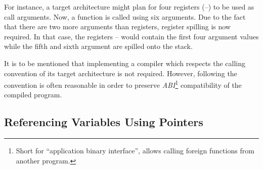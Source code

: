 For instance, a target architecture might plan for four registers (--) to be used as call arguments.
Now, a function is called using six arguments.
Due to the fact that there are two more arguments than registers, register spilling is now required.
In that case, the registers -- would contain the first four argument values while the fifth and sixth argument are spilled onto the stack.
%

It is to be mentioned that implementing a compiler which respects the calling convention of its target architecture is not required.
However, following the convention is often reasonable in order to preserve \emph{ABI}\footnote{Short for \enquote{application binary interface}, allows calling foreign functions from another program.} compatibility of the compiled program.

\subsection{Referencing Variables Using Pointers}\label{sec:pointers}


